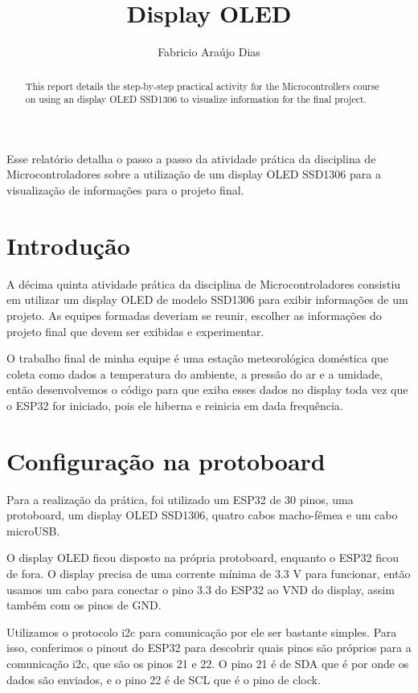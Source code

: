 \documentclass[12pt]{article}
\title{Display OLED}
\author{Fabricio Araújo Dias}
\begin{document}
 

\maketitle

\begin{abstract}
  This report details the step-by-step practical activity for the Microcontrollers course on using an display OLED SSD1306 to visualize information for the final project.
\end{abstract}
  
\begin{resumo}
  Esse relatório detalha o passo a passo da atividade prática da disciplina de Microcontroladores sobre a utilização de um display OLED SSD1306 para a visualização de informações para o projeto final.
\end{resumo}

\section{Introdução}

A décima quinta atividade prática da disciplina de Microcontroladores consistiu em utilizar um display OLED de modelo SSD1306 para exibir informações de um projeto. As equipes formadas deveriam se reunir, escolher as informações do projeto final que devem ser exibidas e experimentar.

O trabalho final de minha equipe é uma estação meteorológica doméstica que coleta como dados a temperatura do ambiente, a pressão do ar e a umidade, então desenvolvemos o código para que exiba esses dados no display toda vez que o ESP32 for iniciado, pois ele hiberna e reinicia em dada frequência.

\section{Configuração na protoboard}

Para a realização da prática, foi utilizado um ESP32 de 30 pinos, uma protoboard, um display OLED SSD1306, quatro cabos macho-fêmea e um cabo microUSB.

O display OLED ficou disposto na própria protoboard, enquanto o ESP32 ficou de fora. O display precisa de uma corrente mínima de 3.3 V para funcionar, então usamos um cabo para conectar o pino 3.3 do ESP32 ao VND do display, assim também com os pinos de GND.

Utilizamos o protocolo i2c para comunicação por ele ser bastante simples. Para isso, conferimos o pinout do ESP32 para descobrir quais pinos são próprios para a comunicação i2c, que são os pinos 21 e 22. O pino 21 é de SDA que é por onde os dados são enviados, e o pino 22 é de SCL que é o pino de clock.
\end{document}
